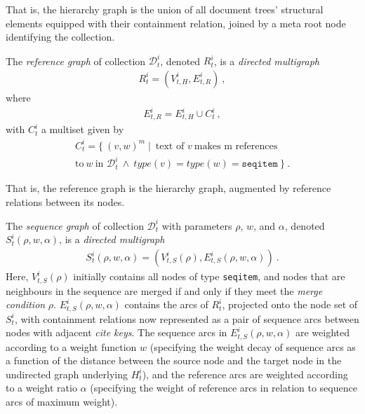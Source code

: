 That is, the hierarchy graph is the union of all document trees' structural elements equipped with their containment relation, joined by a meta root node identifying the collection.

\begin{definition}
	The \emph{reference graph} of collection $\mathcal{D}^i_t$, denoted $R^i_t$, 
	is a \emph{directed multigraph}
	\begin{align*}
	R^i_t = (V^i_{t,H}, E^i_{t,R})~,
	\end{align*} 
	where 
	\begin{align*}
	E^i_{t,R} = E^i_{t,H}\cup C^i_{t}~,
	\end{align*}	
	with $C^i_{t}$ a multiset given by
	\begin{align*}
	C^i_{t} =\{~(v,w)^m \mid~\text{text of~}v~\text{makes m references}\phantom{~.}\\\text{to}~w~\text{in  }\mathcal{D}^i_t~\wedge~type(v)=type(w)=\texttt{seqitem}~\}~. %
	\end{align*}
\end{definition}

That is, the reference graph is the hierarchy graph, 
augmented by reference relations between its nodes.

\begin{definition}\label{def:sequencegraph}
	The \emph{sequence graph} of collection $\mathcal{D}^i_t$ with parameters $\rho$, $w$, and $\alpha$, denoted $S^i_t(\rho, w, \alpha)$, is a \emph{directed multigraph}
	\begin{align*}
	S^i_t(\rho, w, \alpha) = (V^i_{t,S}(\rho), E^i_{t,S}(\rho, w, \alpha))~.
	\end{align*} 
	Here, $V^i_{t,S}(\rho)$ initially contains all nodes of type \texttt{seqitem}, 
	and nodes that are neighbours in the sequence are merged if and only if 
	they meet the \emph{merge condition} $\rho$.
	$E^i_{t,S}(\rho, w, \alpha)$ contains the arcs of $R^i_t$, projected onto the node set of $S^i_t$, with containment relations now represented as a pair of sequence arcs between nodes with adjacent \emph{cite keys}. 
	The sequence arcs in $E^i_{t,S}(\rho, w, \alpha)$ are weighted according to a weight function $w$ (specifying the weight decay of sequence arcs as a function of the distance between the source node and the target node in the undirected graph underlying $H^i_t$), 
	and the reference arcs are weighted according to a weight ratio $\alpha$ (specifying the weight of reference arcs in relation to sequence arcs of maximum weight). 
\end{definition}
 
